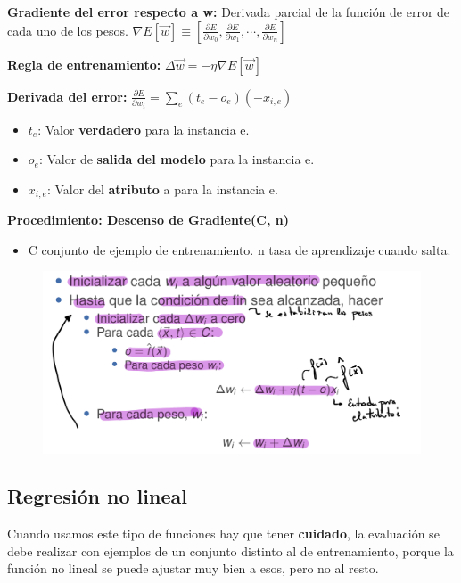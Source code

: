 \documentclass[12pt, twoside, openright]{report} %
\begin{document}
\textbf{Gradiente del error respecto a w:} Derivada parcial de la
función de error de cada uno de los pesos.
\(\nabla E[\vec{w}] \equiv\left[\frac{\partial E}{\partial w_{0}}, \frac{\partial E}{\partial w_{1}}, \cdots ,\frac{\partial E}{\partial w_{n}}\right]\)

\textbf{Regla de entrenamiento:}
\(\Delta \vec{w}=-\eta \nabla E[\vec{w}]\)

\textbf{Derivada del error:}
\(\frac{\partial E}{\partial w_{i}}=\sum_{e}\left(t_{e}-o_{e}\right)\left(-x_{i, e}\right)\)

\begin{itemize}
	\item \(t_e\): Valor \textbf{verdadero} para la instancia e.
	\item \(o_e\): Valor de \textbf{salida del modelo} para la instancia e.
	\item \(x_{i,e}\): Valor del \textbf{atributo} a para la instancia e.
\end{itemize}
\pagebreak
\textbf{Procedimiento: Descenso de Gradiente(C, n)}

\begin{itemize}
	\item C conjunto de ejemplo de entrenamiento. n tasa de aprendizaje cuando
	      salta.
\end{itemize}

\begin{figure}[H]
	{\includegraphics[scale=.2]{image-20210305224415026.png}}
\end{figure}

\subsection{Regresión no lineal}

Cuando usamos este tipo de funciones hay que tener \textbf{cuidado}, la
evaluación se debe realizar con ejemplos de un conjunto distinto al de
entrenamiento, porque la función no lineal se puede ajustar muy bien a
esos, pero no al resto.
\end{document}
